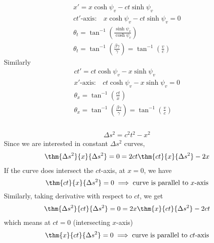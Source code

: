 \documentclass[12pt]{article}
\begin{document}
            \subsubsection{} \text{ }
            \begin{center}
                \def\svgwidth{300pt}
            \end{center}
            \begin{gather*}
                x' = x\cosh \psi_v - ct \sinh\psi_v\\
                ct'\text{-axis:}\quad x\cosh \psi_v - ct \sinh\psi_v = 0\\
                \theta_t = \tan^{-1}\left(\frac{\sinh \psi_v}{\cosh \psi_v}\right)\\
                \theta_t = \tan^{-1}\left(\frac{\beta \gamma}{\gamma}\right) = \tan^{-1}\left(\frac{v}{c}\right)
            \end{gather*}
            Similarly
            \begin{gather*}
                ct' = ct\cosh \psi_v - x \sinh\psi_v\\
                x'\text{-axis:}\quad ct\cosh \psi_v - x \sinh\psi_v = 0\\
                \theta_x = \tan^{-1}\left(\frac{ct}{x}\right)\\
                \theta_x = \tan^{-1}\left(\frac{\beta \gamma}{\gamma}\right) = \tan^{-1}\left(\frac{v}{c}\right)
            \end{gather*}
            \subsubsection{} 
            \begin{figure}[ht]
                \centering
                \def\svgwidth{300pt}
            \end{figure}
            \begin{gather*}
                \Delta s^2 = c^2t^2 - x^2
            \end{gather*}
            Since we are interested in constant $\Delta s^2$ curves, 
            \begin{gather*}
                \thm{\Delta s^2}{x}{\Delta s^2} = 0 = 2ct \thm{ct}{x}{\Delta s^2} - 2x
            \end{gather*}
            If the curve does intersect the $ct$-axis, at $x=0$, we have 
            \begin{equation*}
                \thm{ct}{x}{\Delta s^2} = 0 \implies \text{curve is parallel to $x$-axis}
            \end{equation*}
            Similarly, taking derivative with respect to $ct$, we get
            \begin{gather*}
                \thm{\Delta s^2}{ct}{\Delta s^2} = 0 = 2x \thm{x}{ct}{\Delta s^2} - 2ct
            \end{gather*}
            which means at $ct=0$ (intersecting $x$-axis)
            \begin{equation*}
                \thm{x}{ct}{\Delta s^2} = 0 \implies \text{curve is parallel to $ct$-axis}
            \end{equation*}
\end{document}
